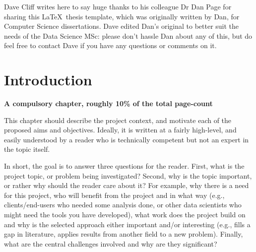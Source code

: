 \documentclass[ %
                    author={Daniel Page},
                supervisor={Dr. Andrew Calway},
                    degree={MSc},
                     title={Some Structural Guidelines for Data Science MSc Theses, Including Those With Long Titles that Run Across Multiple Lines on the Front Page},
                  subtitle={And those including an optional subtitle too, for good measure},
                      type={},
                      year={2021}]{dissertation}
\begin{document}
\vspace{1cm}
Dave Cliff writes here to say huge thanks to his colleague Dr Dan Page for sharing this \LaTeX\ thesis template, which was originally written by Dan, for Computer Science dissertations. Dave edited Dan's original to better suit the needs of the Data Science MSc: please don't hassle Dan about any of this, but do feel free to contact Dave if you have any questions or comments on it.  


%

\mainmatter


\chapter{Introduction}
\label{chap:introduction}

{\bf A compulsory chapter, roughly 10\% of the total page-count}
\vspace{1cm} 

\noindent
This chapter should describe the project context, and motivate each of
the proposed aims and objectives.  Ideally, it is written at a fairly 
high-level, and easily understood by a reader who is technically 
competent but not an expert in the topic itself.

In short, the goal is to answer three questions for the reader.  First, 
what is the project topic, or problem being investigated?  Second, why 
is the topic important, or rather why should the reader care about it?  
For example, why there is a need for this project, who will benefit from the 
project and in what way (e.g., clients/end-users who needed some analysis
done, or other data scientists who might need the tools you have developed), what 
work does the project build on and why is the selected approach either
important and/or interesting (e.g., fills a gap in literature, applies
results from another field to a new problem).  Finally, what are the 
central challenges involved and why are they significant? 
 
\end{document}
